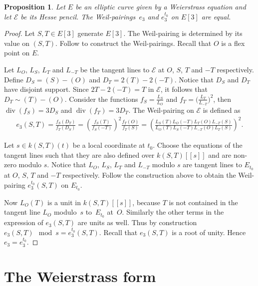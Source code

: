\documentclass[11pt]{article}
\newcommand{\msetp}[1]{{\left({#1}\right)}}					%
\newcommand{\msets}[1]{{\left[{#1}\right]}}					%
\newcommand{\msetss}[1]{{\left[\left[{#1}\right]\right]}}	%
\newcommand{\mdiv}[1]{\operatorname{div}\msetp{#1}}			%
\numberwithin{equation}{section}
\newtheorem{Proposition}[Theorem]{Proposition}
\begin{document}
\begin{Proposition}Let $E$ be an elliptic curve given by a Weierstrass equation and let $\mathcal {E}$ be its Hesse pencil. The Weil-pairings~$e_3$ and $e_3^{t_0}$ on $E\msets {3}$ are equal.
\end{Proposition}
\begin{proof}Let $S,T\in E\msets{3}$ generate $E\msets{3}$. The Weil-pairing is determined by its value on $\msetp{S,T}$. Follow \cite[Exercise~3.16]{silverman1985} to construct the Weil-pairings. Recall that $O$ is a flex point on $E$.

Let $L_O$, $L_S$, $L_T$ and $L_{-T}$ be the tangent lines to $\mathcal{E}$ at $O$, $S$, $T$ and $-T$ respectively. Define $D_S=\msetp{S}-\msetp{O}$ and $D_T= 2\msetp{T}-2\msetp{-T}$. Notice that $D_S$ and $D_T$ have disjoint support. Since $2T-2\msetp{-T}=T$ in $\mathcal{E}$, it follows that $D_T\sim\msetp{T}- \msetp{O}$. Consider the functions $f_S=\frac{L_S}{L_O}$ and $f_T=\big(\frac{L_T}{L_{-T}}\big)^2$, then $\mdiv{f_S}=3D_S$ and $\mdiv{f_T}=3D_T$. The Weil-pairing on $\mathcal{E}$ is defined as
\begin{gather*}
e_3\msetp{S,T}=\frac{f_S\msetp{D_T}}{f_T\msetp{D_S}} =\msetp{\frac{f_S\msetp{T}}{f_S\msetp{-T}}}^2\frac{f_T\msetp{O}}{f_T\msetp{S}}
=\msetp{\frac{L_S\msetp{T}L_O\msetp{-T}L_T\msetp{O}L_{-T}\msetp{S}}{L_O\msetp{T}L_S\msetp{-T}L_{-T}\msetp{O}L_T\msetp{S}}}^2.
\end{gather*}

Let $s\in k\msetp{S,T}\msetp{t}$ be a local coordinate at $t_0$. Choose the equations of the tangent lines such that they are also defined over $k\msetp{S,T}\msetss{s}$ and are non-zero modulo $s$. Notice that $L_O$, $L_S$, $L_T$ and $L_{-T}$ modulo $s$ are tangent lines to $E_{t_0}$ at $O$, $S$, $T$ and $-T$ respectively. Follow the construction above to obtain the Weil-pairing $e_3^{t_0}\msetp{S,T}$ on $E_{t_0}$.

Now $L_O\msetp{T}$ is a unit in $k\msetp{S,T}\msetss{s}$, because $T$ is not contained in the tangent line $L_O$ modulo~$s$ to~$E_{t_0}$ at~$O$. Similarly the other terms in the expression of $e_3\msetp{S,T}$ are units as well. Thus by construction $e_3\msetp{S,T}\!\!\mod s= e_3^{t_0}\msetp{S,T}$. Recall that $e_3\msetp{S,T}$ is a root of unity. Hence $e_3=e_3^{t_0}$.
\end{proof}

\section{The Weierstrass form}\label{hpga:sec:wf}
\end{document}
